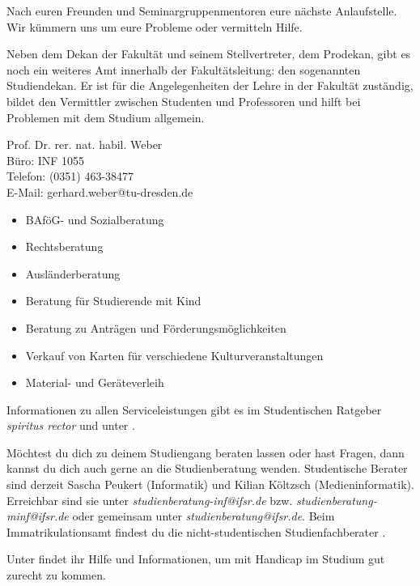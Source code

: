 
Nach euren Freunden und Seminargruppenmentoren eure nächste Anlaufstelle.
Wir kümmern uns um eure Probleme oder vermitteln Hilfe.

Neben dem Dekan der Fakultät und seinem Stellvertreter, dem Prodekan, gibt es noch ein weiteres Amt innerhalb der Fakultätsleitung:
den sogenannten Studiendekan.
Er ist für die Angelegenheiten der Lehre in der Fakultät zuständig, bildet den Vermittler zwischen Studenten und Professoren und hilft bei Problemen mit dem Studium allgemein.

Prof. Dr. rer. nat. habil. Weber \\
Büro: INF 1055 \\
Telefon: (0351) 463-38477 \\
E-Mail: gerhard.weber@tu-dresden.de \\

\begin{itemize}
\item BAföG- und Sozialberatung
\item Rechtsberatung
\item Ausländerberatung
\item Beratung für Studierende mit Kind
\item Beratung zu Anträgen und Förderungsmöglichkeiten
\item Verkauf von Karten für verschiedene Kulturveranstaltungen
\item Material- und Geräteverleih
\end{itemize}

Informationen zu allen Serviceleistungen gibt es im Studentischen Ratgeber \textit{spiritus rector}  und unter .

Möchtest du dich zu deinem Studiengang beraten lassen oder hast Fragen, dann kannst du dich auch gerne an die Studienberatung wenden.
Studentische Berater sind derzeit Sascha Peukert (Informatik) und Kilian Költzsch (Medieninformatik).
Erreichbar sind sie unter \textit{studienberatung-inf@ifsr.de} bzw. \textit{studienberatung-minf@ifsr.de} oder gemeinsam unter \textit{studienberatung@ifsr.de}.
Beim Immatrikulationsamt findest du die nicht-studentischen Studienfachberater .

Unter  findet ihr Hilfe und Informationen, um mit Handicap im Studium gut zurecht zu kommen.

